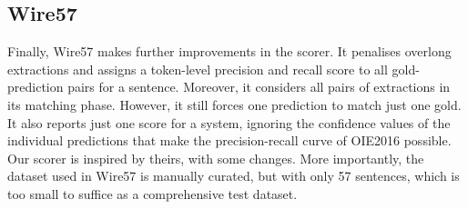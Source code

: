     \subsection{Wire57}
        Finally, Wire57 \cite{Wire57} makes further improvements in the scorer. It  penalises overlong extractions and assigns a token-level precision and recall score to all gold-prediction pairs for a sentence. Moreover, it considers all pairs of extractions in its matching phase. However, it still forces one prediction to match just one gold. It also reports just one score for a system, ignoring the confidence values of the individual predictions that make the precision-recall curve of OIE2016 possible. Our scorer is inspired by theirs, with some changes. More importantly, the dataset used in Wire57 is manually curated, but with only 57 sentences, which is too small to suffice as a comprehensive test dataset.
        





